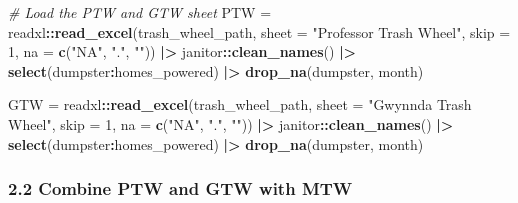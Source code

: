 \documentclass[
]{article}
\newenvironment{Shaded}{\begin{snugshade}}{\end{snugshade}}
\newcommand{\AttributeTok}[1]{\textcolor[rgb]{0.13,0.29,0.53}{#1}}
\newcommand{\CommentTok}[1]{\textcolor[rgb]{0.56,0.35,0.01}{\textit{#1}}}
\newcommand{\DecValTok}[1]{\textcolor[rgb]{0.00,0.00,0.81}{#1}}
\newcommand{\FunctionTok}[1]{\textcolor[rgb]{0.13,0.29,0.53}{\textbf{#1}}}
\newcommand{\NormalTok}[1]{#1}
\newcommand{\OtherTok}[1]{\textcolor[rgb]{0.56,0.35,0.01}{#1}}
\newcommand{\SpecialCharTok}[1]{\textcolor[rgb]{0.81,0.36,0.00}{\textbf{#1}}}
\newcommand{\StringTok}[1]{\textcolor[rgb]{0.31,0.60,0.02}{#1}}
\begin{document}
\begin{Shaded}
\begin{Highlighting}[]
\CommentTok{\# Load the PTW and GTW sheet}
\NormalTok{PTW }\OtherTok{=} 
\NormalTok{  readxl}\SpecialCharTok{::}\FunctionTok{read\_excel}\NormalTok{(trash\_wheel\_path, }\AttributeTok{sheet =} \StringTok{"Professor Trash Wheel"}\NormalTok{, }
                     \AttributeTok{skip =} \DecValTok{1}\NormalTok{, }\AttributeTok{na =} \FunctionTok{c}\NormalTok{(}\StringTok{"NA"}\NormalTok{, }\StringTok{"."}\NormalTok{, }\StringTok{""}\NormalTok{)) }\SpecialCharTok{|\textgreater{}}
\NormalTok{  janitor}\SpecialCharTok{::}\FunctionTok{clean\_names}\NormalTok{() }\SpecialCharTok{|\textgreater{}}
  \FunctionTok{select}\NormalTok{(dumpster}\SpecialCharTok{:}\NormalTok{homes\_powered) }\SpecialCharTok{|\textgreater{}}
  \FunctionTok{drop\_na}\NormalTok{(dumpster, month) }

\NormalTok{GTW }\OtherTok{=} 
\NormalTok{  readxl}\SpecialCharTok{::}\FunctionTok{read\_excel}\NormalTok{(trash\_wheel\_path, }\AttributeTok{sheet =} \StringTok{"Gwynnda Trash Wheel"}\NormalTok{, }
                     \AttributeTok{skip =} \DecValTok{1}\NormalTok{, }\AttributeTok{na =} \FunctionTok{c}\NormalTok{(}\StringTok{"NA"}\NormalTok{, }\StringTok{"."}\NormalTok{, }\StringTok{""}\NormalTok{)) }\SpecialCharTok{|\textgreater{}}
\NormalTok{  janitor}\SpecialCharTok{::}\FunctionTok{clean\_names}\NormalTok{() }\SpecialCharTok{|\textgreater{}}
  \FunctionTok{select}\NormalTok{(dumpster}\SpecialCharTok{:}\NormalTok{homes\_powered) }\SpecialCharTok{|\textgreater{}}
  \FunctionTok{drop\_na}\NormalTok{(dumpster, month) }
\end{Highlighting}
\end{Shaded}

\subsubsection{2.2 Combine PTW and GTW with
MTW}\label{combine-ptw-and-gtw-with-mtw}
\end{document}
